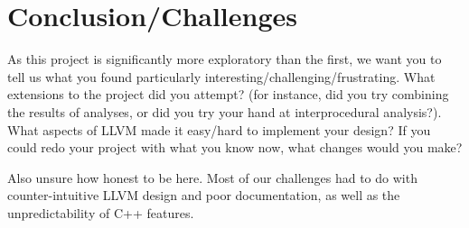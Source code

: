 \documentclass{article}
\theoremstyle{definition}
\begin{document}
\section{Conclusion/Challenges}
\begin{framed}
  As this project is significantly more exploratory than the first, we
  want you to tell us what you found particularly
  interesting/challenging/frustrating. What extensions to the project
  did you attempt? (for instance, did you try combining the results of
  analyses, or did you try your hand at interprocedural
  analysis?). What aspects of LLVM made it easy/hard to implement your
  design? If you could redo your project with what you know now, what
  changes would you make?
\end{framed}
Also unsure how honest to be here. Most of our challenges had to do
with counter-intuitive LLVM design and poor documentation, as well as
the unpredictability of C++ features.
\end{document}
